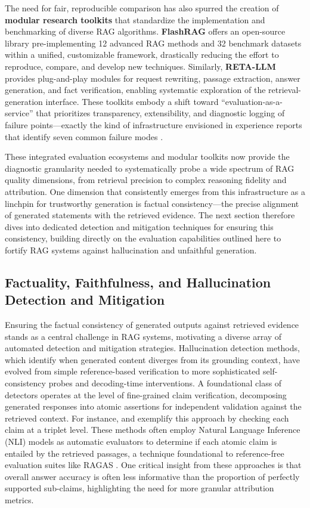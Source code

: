 \documentclass[11pt,a4paper]{article}
\begin{document}
The need for fair, reproducible comparison has also spurred the creation of \textbf{modular research toolkits} that standardize the implementation and benchmarking of diverse RAG algorithms. \textbf{FlashRAG} \cite{arxiv:2405.13576v1} offers an open-source library pre-implementing 12 advanced RAG methods and 32 benchmark datasets within a unified, customizable framework, drastically reducing the effort to reproduce, compare, and develop new techniques. Similarly, \textbf{RETA-LLM} \cite{arxiv:2306.05212v1} provides plug-and-play modules for request rewriting, passage extraction, answer generation, and fact verification, enabling systematic exploration of the retrieval-generation interface. These toolkits embody a shift toward ``evaluation-as-a-service'' that prioritizes transparency, extensibility, and diagnostic logging of failure points---exactly the kind of infrastructure envisioned in experience reports that identify seven common failure modes \cite{arxiv:2401.05856v1}.

These integrated evaluation ecosystems and modular toolkits now provide the diagnostic granularity needed to systematically probe a wide spectrum of RAG quality dimensions, from retrieval precision to complex reasoning fidelity and attribution. One dimension that consistently emerges from this infrastructure as a linchpin for trustworthy generation is factual consistency---the precise alignment of generated statements with the retrieved evidence. The next section therefore dives into dedicated detection and mitigation techniques for ensuring this consistency, building directly on the evaluation capabilities outlined here to fortify RAG systems against hallucination and unfaithful generation.


\subsection{Factuality, Faithfulness, and Hallucination Detection and Mitigation}


Ensuring the factual consistency of generated outputs against retrieved evidence stands as a central challenge in RAG systems, motivating a diverse array of automated detection and mitigation strategies. Hallucination detection methods, which identify when generated content diverges from its grounding context, have evolved from simple reference-based verification to more sophisticated self-consistency probes and decoding-time interventions. A foundational class of detectors operates at the level of fine-grained claim verification, decomposing generated responses into atomic assertions for independent validation against the retrieved context. For instance, \cite{arxiv:2309.15217v1} and \cite{arxiv:2310.01558v1} exemplify this approach by checking each claim at a triplet level. These methods often employ Natural Language Inference (NLI) models as automatic evaluators to determine if each atomic claim is entailed by the retrieved passages, a technique foundational to reference-free evaluation suites like RAGAS \cite{arxiv:2309.15217v1}. One critical insight from these approaches is that overall answer accuracy is often less informative than the proportion of perfectly supported sub-claims, highlighting the need for more granular attribution metrics.
\end{document}
